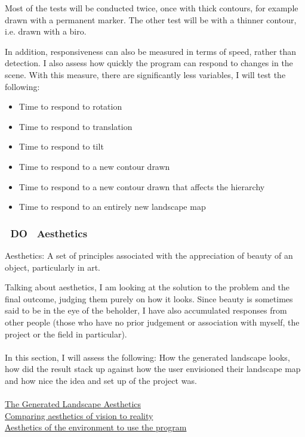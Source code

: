 \documentclass[11pt]{article}
\begin{document}
Most of the tests will be conducted twice, once with thick contours,
for example drawn with a permanent marker. The other test will be
with a thinner contour, i.e. drawn with a biro.

In addition, responsiveness can also be measured in terms of speed, rather
than detection. I also assess how quickly the program can respond
to changes in the scene. With this measure, there are significantly
less variables, I will test the following:

\begin{itemize}
	\item Time to respond to rotation
	\item Time to respond to translation
	\item Time to respond to tilt
	\item Time to respond to a new contour drawn
	\item Time to respond to a new contour drawn that affects the hierarchy
	\item Time to respond to an entirely new landscape map
\end{itemize}

\subsubsection{~DO~ Aesthetics}
\begin{center}
	Aesthetics: A set of principles associated with the appreciation of beauty
	of an object, particularly in art. 
\end{center}

Talking about aesthetics, I am looking at the solution to the problem and
the final outcome, judging them purely on how it looks. Since beauty is 
sometimes said to be in the eye of the beholder, I have also accumulated
responses from other people (those who have no prior judgement or association
with myself, the project or the field in particular).\\
\\
In this section, I will assess the following: How the generated landscape
looks, how did the result stack up against how the user envisioned their
landscape map and how nice the idea and set up of the project was.\\
\\
\underline{The Generated Landscape Aesthetics}\\
\underline{Comparing aesthetics of vision to reality}\\
\underline{Aesthetics of the environment to use the program}\\
\end{document}

